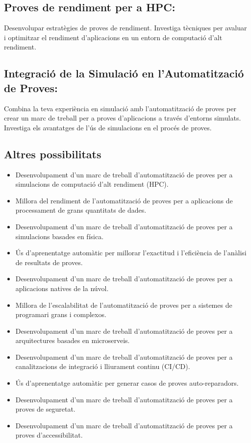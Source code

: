 \documentclass[a4paper, 12pt, left=1.5cm, right=1.5cm, top=1.5cm, bottom=1.5cm]{article}
\begin{document}
\subsection{Proves de rendiment per a HPC:}
Desenvolupar estratègies de proves de rendiment.
Investiga tècniques per avaluar i optimitzar el rendiment d'aplicacions en un entorn de computació d'alt rendiment.

\subsection{Integració de la Simulació en l'Automatització de Proves:}
Combina la teva experiència en simulació amb l'automatització de proves per crear un marc de treball per a proves d'aplicacions a través d'entorns simulats.
Investiga els avantatges de l'ús de simulacions en el procés de proves.

\subsection{Altres possibilitats}
\begin{itemize}
\item Desenvolupament d'un marc de treball d'automatització de proves per a simulacions de computació d'alt rendiment (HPC).
\item Millora del rendiment de l'automatització de proves per a aplicacions de processament de grans quantitats de dades.
\item Desenvolupament d'un marc de treball d'automatització de proves per a simulacions basades en física.
\item Ús d'aprenentatge automàtic per millorar l'exactitud i l'eficiència de l'anàlisi de resultats de proves.
\item Desenvolupament d'un marc de treball d'automatització de proves per a aplicacions natives de la núvol.
\item Millora de l'escalabilitat de l'automatització de proves per a sistemes de programari grans i complexos.
\item Desenvolupament d'un marc de treball d'automatització de proves per a arquitectures basades en microserveis.
\item Desenvolupament d'un marc de treball d'automatització de proves per a canalitzacions de integració i lliurament continu (CI/CD).
\item Ús d'aprenentatge automàtic per generar casos de proves auto-reparadors.
\item Desenvolupament d'un marc de treball d'automatització de proves per a proves de seguretat.
\item Desenvolupament d'un marc de treball d'automatització de proves per a proves d'accessibilitat.
\end{itemize}
\end{document}
